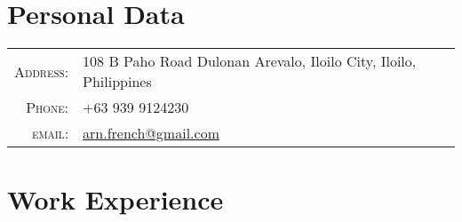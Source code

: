 \documentclass[a4paper,10pt]{article}
\begin{document}
\pagestyle{empty}

\par{\bigskip\par}


\section{Personal Data}

\begin{tabular}{rl}
  \textsc{Address:} & 108 B Paho Road Dulonan Arevalo, Iloilo City, Iloilo, Philippines\\
  \textsc{Phone:}   & +63 939 9124230\\
  \textsc{email:}   & \href{mailto:arn.french@gmail.com}{arn.french@gmail.com}
\end{tabular}

\section{Work Experience}
\end{document}
